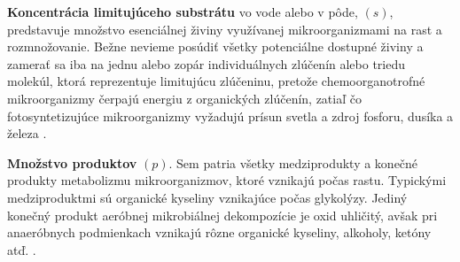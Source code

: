 \textbf{Koncentrácia limitujúceho substrátu} vo vode alebo v pôde, $(s)$, predstavuje množstvo esenciálnej živiny využívanej mikroorganizmami na rast a rozmnožovanie. Bežne nevieme posúdiť všetky potenciálne dostupné živiny a zamerať sa iba na jednu alebo zopár individuálnych zlúčenín alebo triedu molekúl, ktorá reprezentuje limitujúcu zlúčeninu, pretože chemoorganotrofné mikroorganizmy čerpajú energiu z organických zlúčenín, zatiaľ čo fotosyntetizujúce mikroorganizmy vyžadujú prísun svetla a zdroj fosforu, dusíka a železa \cite{panikov:kinetics_MO_processes:2016}.

\textbf{Množstvo produktov} $(p)$. Sem patria všetky medziprodukty a konečné produkty metabolizmu mikroorganizmov, ktoré vznikajú počas rastu. Typickými medziproduktmi sú organické kyseliny vznikajúce počas glykolýzy. Jediný konečný produkt aeróbnej mikrobiálnej dekompozície je oxid uhličitý, avšak pri anaeróbnych podmienkach vznikajú rôzne organické kyseliny, alkoholy, ketóny atď. \cite{panikov:kinetics_MO_processes:2016}.
